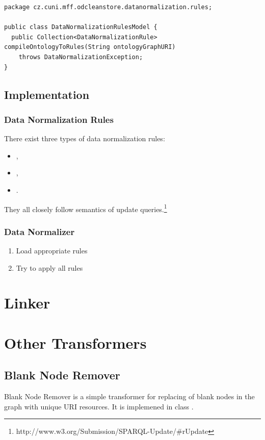 \begin{lstlisting}[caption=Data Normalization Rule Generation,label=lst:dataNormalizationRulesModel]
package cz.cuni.mff.odcleanstore.datanormalization.rules;

public class DataNormalizationRulesModel {
  public Collection<DataNormalizationRule> compileOntologyToRules(String ontologyGraphURI)
    throws DataNormalizationException;
}
\end{lstlisting}


\subsection{Implementation}

\subsubsection*{Data Normalization Rules}

There exist three types of data normalization rules:

\begin{itemize}
	\item {},
	\item {},
	\item {}.
\end{itemize}

They all closely follow semantics of  update queries.\footnote{http://www.w3.org/Submission/SPARQL-Update/\#rUpdate}

\subsubsection*{Data Normalizer}

\begin{enumerate}
	\item Load appropriate rules
	\item Try to apply all rules
\end{enumerate}
\section{Linker}
\section{Other Transformers}
\subsection{Blank Node Remover}
Blank Node Remover is a simple transformer for replacing of blank nodes in the  graph with unique URI resources. It is implemened in class .

